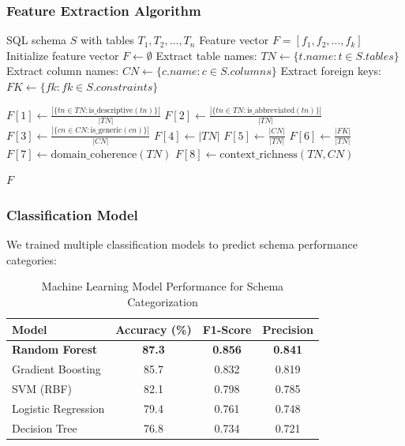 \subsubsection{Feature Extraction Algorithm}

\begin{algorithm}
\caption{Schema Feature Extraction}
\begin{algorithmic}[1]
\Require SQL schema $S$ with tables $T_1, T_2, \ldots, T_n$
\Ensure Feature vector $F = [f_1, f_2, \ldots, f_k]$
\State Initialize feature vector $F \leftarrow \emptyset$
\State Extract table names: $TN \leftarrow \{t.name : t \in S.tables\}$
\State Extract column names: $CN \leftarrow \{c.name : c \in S.columns\}$
\State Extract foreign keys: $FK \leftarrow \{fk : fk \in S.constraints\}$

\State $F[1] \leftarrow \frac{|\{tn \in TN : \text{is\_descriptive}(tn)\}|}{|TN|}$ 
\State $F[2] \leftarrow \frac{|\{tn \in TN : \text{is\_abbreviated}(tn)\}|}{|TN|}$ 
\State $F[3] \leftarrow \frac{|\{cn \in CN : \text{is\_generic}(cn)\}|}{|CN|}$ 
\State $F[4] \leftarrow |TN|$ 
\State $F[5] \leftarrow \frac{|CN|}{|TN|}$ 
\State $F[6] \leftarrow \frac{|FK|}{|TN|}$ 
\State $F[7] \leftarrow \text{domain\_coherence}(TN)$ 
\State $F[8] \leftarrow \text{context\_richness}(TN, CN)$ 

\State \Return $F$
\end{algorithmic}
\end{algorithm}

\subsubsection{Classification Model}

We trained multiple classification models to predict schema performance categories:

\begin{table}[H]
\centering
\caption{Machine Learning Model Performance for Schema Categorization}
\label{tab:ml_model_performance}
\begin{tabular}{@{}lccc@{}}
\toprule
Model & Accuracy (\%) & F1-Score & Precision \\ \midrule
\textbf{Random Forest} & \textbf{87.3} & \textbf{0.856} & \textbf{0.841} \\
Gradient Boosting & 85.7 & 0.832 & 0.819 \\
SVM (RBF) & 82.1 & 0.798 & 0.785 \\
Logistic Regression & 79.4 & 0.761 & 0.748 \\
Decision Tree & 76.8 & 0.734 & 0.721 \\ \bottomrule
\end{tabular}
\end{table}

